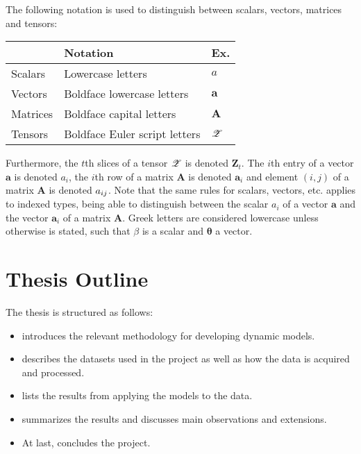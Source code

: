     The following notation is used to distinguish between scalars, vectors, matrices and tensors:
    
    \begin{center}
        \begin{tabular}{l|l|l}
                     & Notation & Ex. \\ \hline
            Scalars  & Lowercase letters & $a$ \\
            Vectors  & Boldface lowercase letters & $\bm{a}$ \\
            Matrices & Boldface capital letters & $\bm{A}$ \\
            Tensors  & Boldface Euler script letters & $\bm{\mathscr{Z}}$ \\
        \end{tabular}
    \end{center}
    
    Furthermore, the $t$th slices of a tensor $\bm{\mathscr{Z}}$ is denoted $\bm{Z}_t$. The $i$th entry of a vector $\bm{a}$ is denoted $a_i$, the $i$th row of a matrix $\bm{A}$ is denoted $\bm{a}_i$ and element $(i,j)$ of a matrix $\bm{A}$ is denoted $\sub(a)$. Note that the same rules for scalars, vectors, etc. applies to indexed types, being able to distinguish between the scalar $a_i$ of a vector $\bm{a}$ and the vector $\bm{a}_i$ of a matrix $\bm{A}$. Greek letters are considered lowercase unless otherwise is stated, such that $\beta$ is a scalar and $\bm{\theta}$ a vector.
    
\section{Thesis Outline}

    The thesis is structured as follows:
    \begin{itemize}
        \item {} introduces the relevant methodology for developing dynamic models.
        \item {} describes the datasets used in the project as well as how the data is acquired and processed.
        \item {} lists the results from applying the models to the data.
        \item {} summarizes the results and discusses main observations and extensions.
        \item At last,  concludes the project.
    \end{itemize}